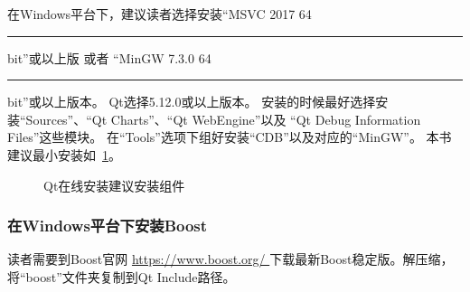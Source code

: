 在Windows平台下，建议读者选择安装“MSVC 2017 64\hspace{0.05em}\rule[0.7ex]{0.4em}{0.65pt}\hspace{0.05em}bit”或以上版
或者
“MinGW 7.3.0 64\hspace{0.05em}\rule[0.7ex]{0.4em}{0.65pt}\hspace{0.05em}bit”或以上版本。
Qt选择5.12.0或以上版本。
安装的时候最好选择安装“Sources”、“Qt Charts”、“Qt WebEngine”以及
“Qt Debug Information Files”这些模块。
在“Tools”选项下组好安装“CDB”以及对应的“MinGW”。
本书建议最小安装如\figurename\ \ref{p000001}。
\begin{figure}[htb] %
\marginnote{\setlength\fboxsep{2pt}\fbox{\footnotesize{\kaishu\figurename\,}\footnotesize{\ref{p000001}}}}\centering %
\setlength\fboxsep{-1pt} %
\caption{Qt在线安装建议安装组件} %
\label{p000001} %
\end{figure}


\FloatBarrier
\subsubsection{
在Windows平台下安装Boost
}\label{ss000210}

读者需要到Boost官网 \url{https://www.boost.org/
}下载最新Boost稳定版。解压缩，将“boost”文件夹复制到Qt Include路径。

